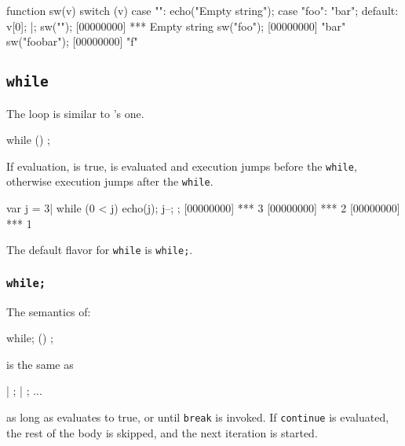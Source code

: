 \begin{urbiscript}
function sw(v)
{
  switch (v)
  {
    case "":
      echo("Empty string");
    case "foo":
      "bar";
    default:
      v[0];
  }
}|;
sw("");
[00000000] *** Empty string
sw("foo");
[00000000] "bar"
sw("foobar");
[00000000] "f"
\end{urbiscript}

\subsection{\lstinline{while}}
\label{sec:lang:while}


The  loop is similar to \langC's one.

\begin{urbiunchecked}
while ()
  ;
\end{urbiunchecked}

If  evaluation, is true,  is evaluated and
execution jumps before the \lstinline{while}, otherwise execution
jumps after the \lstinline{while}.

\begin{urbiscript}
var j = 3|
while (0 < j)
{
  echo(j);
  j--;
};
[00000000] *** 3
[00000000] *** 2
[00000000] *** 1
\end{urbiscript}

The default flavor for \lstinline{while} is \lstinline|while;|.

\subsubsection{\lstinline{while;}}
\label{sec:lang:while:semi}
The semantics of:

\begin{urbiunchecked}
while; ()
  ;
\end{urbiunchecked}

\noindent
is the same as

\begin{urbiunchecked}
 |  ;  |  ; ...
\end{urbiunchecked}

\noindent
as long as  evaluates to true, or until \lstinline{break} is
invoked.  If \lstinline{continue} is evaluated, the rest of the body
is skipped, and the next iteration is started.

